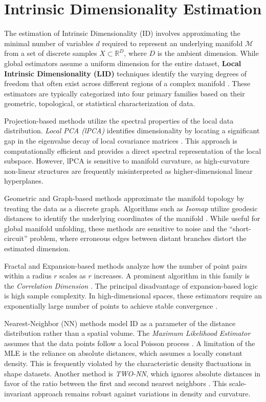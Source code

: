 \documentclass{thesis}
\begin{document}
\section{Intrinsic Dimensionality Estimation}\label{rel_work_estimation}

The estimation of Intrinsic Dimensionality (ID) involves approximating the minimal number of variables $d$ required to represent an underlying manifold $\mathcal{M}$ from a set of discrete samples $X \subset \mathbb{R}^D$, where $D$ is the ambient dimension. While global estimators assume a uniform dimension for the entire dataset, \textbf{Local Intrinsic Dimensionality (LID)} techniques identify the varying degrees of freedom that often exist across different regions of a complex manifold \cite{IntrinsicDim}. These estimators are typically categorized into four primary families based on their geometric, topological, or statistical characterization of data.

Projection-based methods utilize the spectral properties of the local data distribution. \textit{Local PCA (lPCA)} identifies dimensionality by locating a significant gap in the eigenvalue decay of local covariance matrices \cite{Fukunaga1971, fanlpca}. This approach is computationally efficient and provides a direct spectral representation of the local subspace. However, lPCA is sensitive to manifold curvature, as high-curvature non-linear structures are frequently misinterpreted as higher-dimensional linear hyperplanes.

Geometric and Graph-based methods approximate the manifold topology by treating the data as a discrete graph. Algorithms such as \textit{Isomap} utilize geodesic distances to identify the underlying coordinates of the manifold \cite{Tenenbaum2000}. While useful for global manifold unfolding, these methods are sensitive to noise and the ``short-circuit'' problem, where erroneous edges between distant branches distort the estimated dimension.

Fractal and Expansion-based methods analyze how the number of point pairs within a radius $r$ scales as $r$ increases. A prominent algorithm in this family is the \textit{Correlation Dimension} \cite{Grassberger1983}. The principal disadvantage of expansion-based logic is high sample complexity. In high-dimensional spaces, these estimators require an exponentially large number of points to achieve stable convergence \cite{Kegl2002}.

Nearest-Neighbor (NN) methods model ID as a parameter of the distance distribution rather than a spatial volume. The \textit{Maximum Likelihood Estimator} assumes that the data points follow a local Poisson process \cite{Levina2004MaximumLE}. A limitation of the MLE is the reliance on absolute distances, which assumes a locally constant density. This is frequently violated by the characteristic density fluctuations in shape datasets. Another method is \textit{TWO-NN}, which ignores absolute distances in favor of the ratio between the first and second nearest neighbors \cite{faccotwonn}. This scale-invariant approach remains robust against variations in density and curvature.
\end{document}

